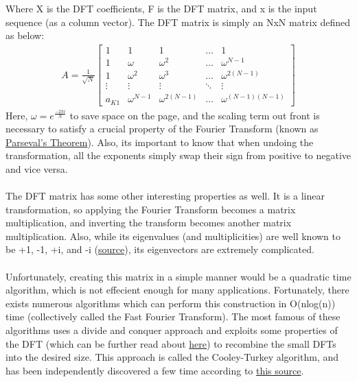 \documentclass[notitlepage]{article}
\begin{document}
Where X is the DFT coefficients, F is the DFT matrix, and x is the input sequence (as a column vector).
The DFT matrix is simply an NxN matrix defined as below:
\begin{align*}
    A = \frac{1}{\sqrt{N}}\begin{bmatrix}
                              1      & 1            & 1               & \dots  & 1                   \\
                              1      & \omega       & \omega^2        & \dots  & \omega^{N-1}        \\
                              1      & \omega^2     & \omega^3        & \dots  & \omega^{2(N-1)}     \\
                              \vdots & \vdots       & \vdots          & \ddots & \vdots              \\
                              a_{K1} & \omega^{N-1} & \omega^{2(N-1)} & \dots  & \omega^{(N-1)(N-1)}
                          \end{bmatrix}
\end{align*}
Here, $\omega = e^{\frac{-2\pi{i}}{N}}$ to save space on the page, and the scaling term out front is
necessary to satisfy a crucial property of the Fourier Transform (known as \href{https://en.wikipedia.org/wiki/Parseval%27s_theorem}{Parseval's Theorem}).
Also, its important to know that when undoing the transformation, all the exponents simply swap their sign
from positive to negative and vice versa.
\\\\
The DFT matrix has some other interesting properties as well. It is a linear transformation, so applying the
Fourier Transform becomes a matrix multiplication, and inverting the transform becomes another matrix multiplication.
Also, while its eigenvalues (and multiplicities) are well known to be +1, -1, +i, and -i (\href{https://users.metu.edu.tr/ccandan/pub_dir/Eig_Structure_DFT_IEEE_SPM_Column_March2011.pdf}{source}), its eigenvectors are extremely complicated.
\\\\
Unfortunately, creating this matrix in a simple manner would be a quadratic time algorithm, which
is not effecient enough for many applications. Fortunately, there exists numerous
algorithms which can perform this construction in O(nlog(n)) time (collectively called the Fast Fourier Transform).
The most famous of these algorithms
uses a divide and conquer approach and exploits some properties of the DFT (which can be further
read about \href{https://vanhunteradams.com/FFT/FFT.html#The-Cooley-Tukey-FFT}{here}) to recombine
the small DFTs into the desired size. This approach is called the Cooley-Turkey algorithm, and has
been independently discovered a few time according to \href{https://faculty.washington.edu/seattle/physics541/%202010-Fourier-transforms/history-3.pdf}{this source}.
\end{document}
